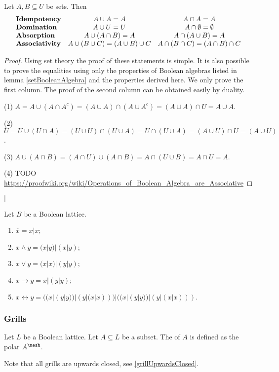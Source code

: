 \begin{corollary} \label{BooleanConsequences}
Let $A,B\subseteq U$ be sets. Then
\[ \begin{array}{l c c}
\text{\textbf{Idempotency}} & A\cup A = A & A\cap A = A \\
\text{\textbf{Domination}} & A\cup U = U & A\cap \emptyset = \emptyset \\
\text{\textbf{Absorption}} & A\cup(A\cap B) = A & A\cap(A\cup B) = A \\
\text{\textbf{Associativity}} & A\cup(B\cup C) = (A\cup B)\cup C & A\cap(B\cap C) = (A\cap B)\cap C
\end{array} \]
\end{corollary}
\begin{proof}
Using set theory the proof of these statements is simple. It is also possible to prove the equalities using only the properties of Boolean algebras listed in lemma \ref{setBooleanAlgebra} and the properties derived here. We only prove the first column. The proof of the second column can be obtained easily by duality.

(1) $A = A\cup(A\cap A^c) = (A\cup A)\cap (A\cup A^c) = (A\cup A)\cap U = A\cup A$.

(2) $U = U\cup (U\cap A) = (U\cup U)\cap (U\cup A) = U\cap (U\cup A) = (A\cup U)\cap U = (A\cup U)$.

(3) $A\cup(A\cap B) = (A\cap U)\cup(A\cap B) = A\cap(U\cup B) = A\cap U = A$.

(4) TODO \url{https://proofwiki.org/wiki/Operations_of_Boolean_Algebra_are_Associative}
\end{proof}

\begin{definition}
 $|$
\end{definition}

\begin{proposition}
Let $B$ be a Boolean lattice.
\begin{enumerate}
\item $\overline{x} = x|x$;
\item $x\wedge y = (x|y)|(x|y)$;
\item $x\vee y = (x|x)|(y|y)$;
\item $x\to y = x|(y|y)$;
\item $x\leftrightarrow y = ((x|(y|y))|(y|(x|x)))|((x|(y|y))|(y|(x|x)))$.
\end{enumerate}
\end{proposition}

\subsubsection{Grills}
\begin{definition}
Let $L$ be a Boolean lattice. Let $A \subseteq L$ be a subset. The  of $A$ is defined as the polar $A^{\mesh}$.
\end{definition}
Note that all grills are upwards closed, see \ref{grillUpwardsClosed}.

